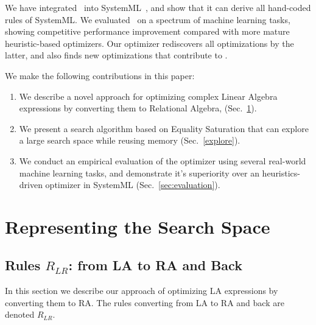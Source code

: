 We have integrated \sys\ into
SystemML~\cite{DBLP:reference/bdt/Boehm19}, and show that it can
derive all hand-coded rules of SystemML.  We evaluated \sys\ on a
spectrum of machine learning tasks, showing competitive performance
improvement compared with more mature heuristic-based optimizers. Our
optimizer rediscovers all optimizations by the latter, and also finds
new optimizations that contribute to .

We make the following contributions in this paper:
\begin{enumerate}
\item We describe a novel approach for optimizing complex Linear
  Algebra expressions by converting them to Relational Algebra,  (Sec.~\ref{sec:la:to:ra}).
\item We present a search algorithm based on Equality Saturation that
  can explore a large search space while reusing memory (Sec.~\ref{explore}).
\item We conduct an empirical evaluation of the optimizer using
  several real-world machine learning tasks, and demonstrate it's
  superiority over an heuristics-driven optimizer in SystemML
  (Sec.~\ref{sec:evaluation}).
\end{enumerate}{}

\section{Representing the Search Space} \label{sec:la:to:ra}

\subsection{Rules \texorpdfstring{$R_{LR}$}{R\_LR}: from  LA to RA and Back}
In this section we describe our approach of optimizing LA expressions
by converting them to RA.  The rules converting from LA to RA and back
are denoted $R_{LR}$.

